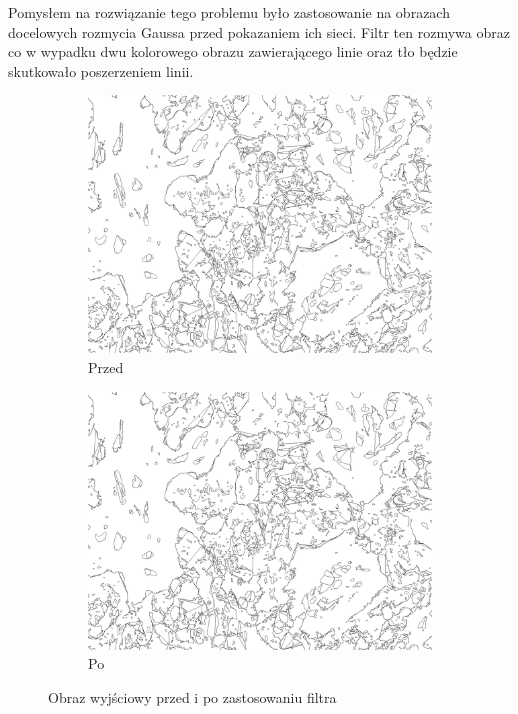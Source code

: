 \documentclass{article}
\begin{document}
Pomysłem na rozwiązanie tego problemu było zastosowanie na obrazach docelowych rozmycia Gaussa przed pokazaniem ich sieci.
Filtr ten rozmywa obraz co w wypadku dwu kolorowego obrazu zawierającego linie oraz tło będzie skutkowało poszerzeniem linii.
\begin{figure}[H]
    \centering
    \begin{subfigure}{0.4\linewidth}
        \includegraphics[width=\linewidth]{images/output.jpg}
        \caption{Przed}
    \end{subfigure}
    \begin{subfigure}{0.4\linewidth}
        \includegraphics[width=\linewidth]{images/output.jpg}
        \caption{Po}
    \end{subfigure}
    \caption{Obraz wyjściowy przed i po zastosowaniu filtra}
    \label{fig:input_split}
\end{figure}
\end{document}
